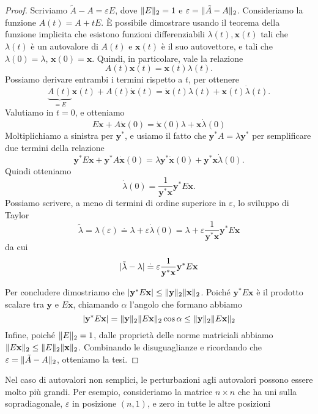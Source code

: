 \documentclass[a4paper]{report}
\DeclarePairedDelimiter{\abs}{\lvert}{\rvert}
\DeclarePairedDelimiter{\norm}{\lVert}{\rVert}
\theoremstyle{definiton}
\theoremstyle{remark}
\begin{document}
\begin{proof}
Scriviamo $\tilde{A} - A = \varepsilon E$, dove $\norm{E}_2 = 1$ e $\varepsilon = \norm{\tilde{A}-A}_2$. Consideriamo la funzione $A(t) = A + t E$. È possibile dimostrare usando il teorema della funzione implicita che esistono funzioni differenziabili $\lambda(t), \mathbf{x}(t)$ tali che $\lambda(t)$ è un autovalore di $A(t)$ e $\mathbf{x}(t)$ è il suo autovettore, e tali che $\lambda(0)=\lambda$, $\mathbf{x}(0) = \mathbf{x}$. Quindi, in particolare, vale la relazione
\[
A(t)\mathbf{x}(t) = \mathbf{x}(t) \lambda(t).
\]
Possiamo derivare entrambi i termini rispetto a $t$, per ottenere
\[
\underbrace{\dot{A}(t)}_{=E} \mathbf{x}(t) + A(t)\dot{\mathbf{x}}(t) = \dot{\mathbf{x}}(t) \lambda(t) + \mathbf{x}(t) \dot{\lambda}(t).
\]
Valutiamo in $t=0$, e otteniamo
\[
E \mathbf{x} + A \dot{\mathbf{x}}(0) = \dot{\mathbf{x}}(0) \lambda + \mathbf{x} \dot{\lambda}(0)
\]
Moltiplichiamo a sinistra per $\mathbf{y}^*$, e usiamo il fatto che $\mathbf{y}^* A = \lambda \mathbf{y}^*$ per semplificare due termini della relazione
\[
\mathbf{y}^* E \mathbf{x} +  \mathbf{y}^*A \dot{\mathbf{x}}(0) = \lambda\mathbf{y}^* \dot{\mathbf{x}}(0)  + \mathbf{y}^* \mathbf{x} \dot{\lambda}(0).
\]
Quindi otteniamo
\[
\dot{\lambda}(0) = \frac{1}{\mathbf{y}^*\mathbf{x}} \mathbf{y}^* E \mathbf{x}.
\]
Possiamo scrivere, a meno di termini di ordine superiore in $\varepsilon$, lo sviluppo di Taylor
\begin{equation} \label{eigperturb}
\tilde{\lambda} = \lambda(\varepsilon) \stackrel{.}{=} \lambda + \varepsilon \dot{\lambda}(0) = \lambda + \varepsilon \frac{1}{\mathbf{y}^*\mathbf{x}} \mathbf{y}^* E \mathbf{x}
\end{equation}
da cui
\[
\abs{\tilde{\lambda} - \lambda} \stackrel{.}{=} \varepsilon \frac{1}{\mathbf{y}^*\mathbf{x}} \mathbf{y}^* E \mathbf{x}
\]

Per concludere dimostriamo che $\abs{\mathbf{y}^* E \mathbf{x}} \leq \norm{\mathbf{y}}_2\norm{\mathbf{x}}_2$. Poiché $\mathbf{y}^* E \mathbf{x}$ è il prodotto scalare tra $\mathbf{y}$ e $E \mathbf{x}$, chiamando $\alpha$ l'angolo che formano abbiamo
\[
    \abs{\mathbf{y}^* E \mathbf{x}} = \norm{\mathbf{y}}_2 \norm{E \mathbf{x}}_2 \cos\alpha \leq \norm{\mathbf{y}}_2 \norm{E \mathbf{x}}_2
\]
Infine, poiché $\norm{E}_2 = 1$, dalle proprietà delle norme matriciali abbiamo $\norm{E\mathbf{x}}_2 \leq \norm{E}_2\norm{\mathbf{x}}_2$. Combinando le disuguaglianze e ricordando che $\varepsilon = \norm{\tilde{A}-A}_2$, otteniamo la tesi.
\end{proof}
Nel caso di autovalori non semplici, le perturbazioni agli autovalori possono essere molto più grandi. Per esempio, consideriamo la matrice $n\times n$ che ha uni sulla sopradiagonale, $\varepsilon$ in posizione $(n,1)$, e zero in tutte le altre posizioni
\end{document}
